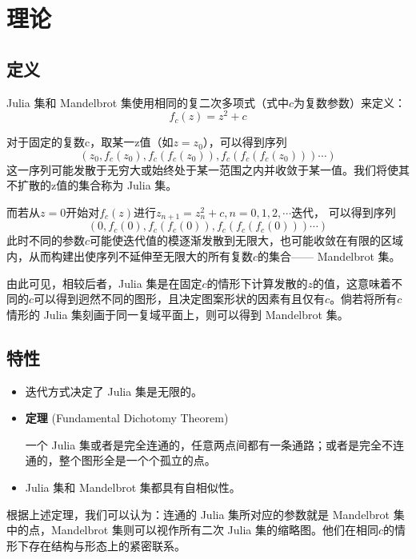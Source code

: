 \section{理论}

\subsection{定义}

Julia 集和 Mandelbrot 集使用相同的复二次多项式（式中$c$为复数参数）来定义：
$$f_c(z)=z^2+c$$

对于固定的复数c，取某一z值（如$z=z_0$），可以得到序列
$$(z_0,f_c(z_0),f_c(f_c(z_0)),f_c(f_c(f_c(z_0)))\cdots)$$
这一序列可能发散于无穷大或始终处于某一范围之内并收敛于某一值。我们将使其不扩散的z值的集合称为 Julia 集。\textsuperscript{\cite{enwiki-juliaset}}

而若从$z=0$开始对$f_c(z)$进行$z_{n+1}=z^2_n+c,n=0,1,2,\cdots$迭代，
可以得到序列
$$(0,f_c(0),f_c(f_c(0)),f_c(f_c(f_c(0)))\cdots)$$
此时不同的参数$c$可能使迭代值的模逐渐发散到无限大，也可能收敛在有限的区域内，从而构建出使序列不延伸至无限大的所有复数$c$的集合—— Mandelbrot 集。

由此可见，相较后者，Julia 集是在固定$c$的情形下计算发散的$z$的值，这意味着不同的$c$可以得到迥然不同的图形，且决定图案形状的因素有且仅有$c$。倘若将所有$c$情形的 Julia 集刻画于同一复域平面上，则可以得到 Mandelbrot 集。

\subsection{特性}

\begin{itemize}
	\item 迭代方式决定了 Julia 集是无限的。\textsuperscript{\cite{book-julia}}
	\item \textbf{定理} (Fundamental Dichotomy Theorem)\textsuperscript{\cite{website-julia-mandelbrot}}

	一个 Julia 集或者是完全连通的，任意两点间都有一条通路；或者是完全不连通的，整个图形全是一个个孤立的点。
	\item Julia 集和 Mandelbrot 集都具有自相似性。
\end{itemize}

根据上述定理，我们可以认为：连通的 Julia 集所对应的参数就是 Mandelbrot 集中的点，Mandelbrot 集则可以视作所有二次 Julia 集的缩略图。他们在相同$c$的情形下存在结构与形态上的紧密联系。\textsuperscript{\cite{website-juliaset}}